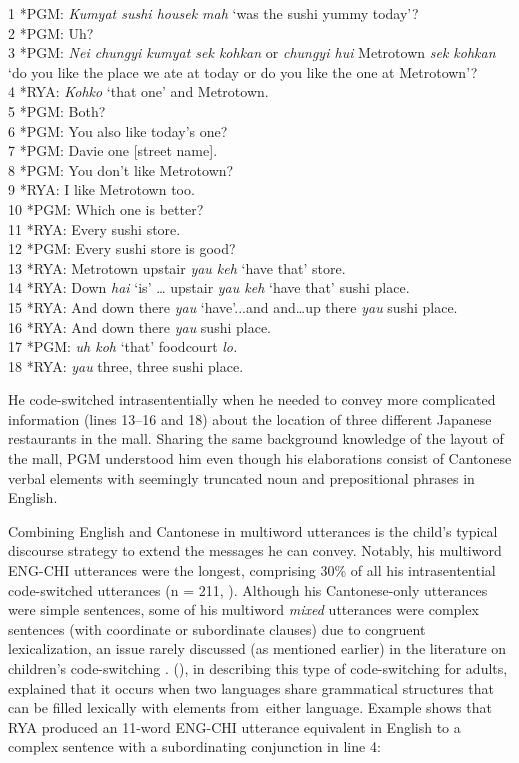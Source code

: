 \documentclass[output=paper,colorlinks,citecolor=brown]{langscibook}
\begin{document}
1   *PGM:  \textit{Kumyat sushi housek mah} ‘was the sushi yummy today’? \\
2   *PGM:  Uh? \\
3   *PGM:  \textit{Nei chungyi kumyat sek kohkan} or \textit{chungyi hui} Metrotown \textit{sek kohkan} ‘do you like the place we ate at today or do you like the one at Metrotown’?\\
4   *RYA:   \textit{Kohko} ‘that one’ and Metrotown.\\
5   *PGM:   Both? \\
6   *PGM:  You also like today’s one? \\
7   *PGM:  Davie one [street name]. \\
8   *PGM:  You don’t like Metrotown?\\
9   *RYA:   I like Metrotown too.\\
10 *PGM:   Which one is better?\\
11 *RYA:   Every sushi store.\\
12 *PGM:   Every sushi store is good?\\
13 *RYA:   Metrotown upstair \textit{yau keh} ‘have that’ store. \\
14 *RYA:   Down \textit{hai} ‘is’ … upstair \textit{yau keh} ‘have that’ sushi place.\\
15 *RYA:  And down there \textit{yau} ‘have’...and and…up there \textit{yau} sushi place. \\
16 *RYA:  And down there \textit{yau} sushi place.\\
17 *PGM:   \textit{uh koh} ‘that’ foodcourt \textit{lo.} \\
18 *RYA:   \textit{yau} three, three sushi place.

    \z

He code-switched intrasententially when he needed to convey more complicated information (lines 13–16 and 18) about the location of three different Japanese restaurants in the mall. Sharing the same background knowledge of the layout of the mall, PGM understood him even though his elaborations consist of Cantonese verbal elements with seemingly truncated noun and prepositional phrases in English. 

Combining English and Cantonese in multiword utterances is the child’s typical discourse strategy to extend the messages he can convey. Notably, his multiword ENG-CHI utterances were the longest, comprising 30\% of all his intrasentential code-switched utterances (n = 211, ). Although his Cantonese-only utterances were simple sentences, some of his multiword \textit{mixed} utterances were complex sentences (with coordinate or subordinate clauses) due to congruent lexicalization, an issue rarely discussed (as mentioned earlier) in the literature on children’s code-switching \citep{Treffers-Daller2022}. \citeauthor{Muysken1997} (\citeyear{Muysken1997,Muysken2000}), in describing this type of code-switching for adults, explained that it occurs when two languages share grammatical structures that can be filled lexically with elements from~either language. Example  shows that RYA produced an 11-word ENG-CHI utterance equivalent in English to a complex sentence with a subordinating conjunction in line 4:
\end{document}
